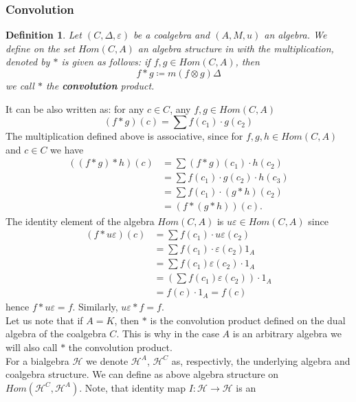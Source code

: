 \documentclass[a4paper, 12pt]{report}
\newtheorem{definition}{Definition}
\begin{document}
\subsubsection{Convolution}
\begin{definition}
Let $(C, \Delta, \varepsilon)$ be a coalgebra and $(A, M, u)$ an algebra. We define on the set $Hom(C, A)$
an algebra structure in with the multiplication, denoted by $*$ is given as follows: if
$f, g \in Hom(C, A)$, then
\begin{equation*}
f*g \coloneqq m(f \otimes g)\Delta
\end{equation*}
we call $*$ the \textbf{convolution} product.
\end{definition}
It can be also written as: for any $c \in C$, any $f, g \in Hom(C, A)$
\begin{equation*}
(f*g)(c) = \sum f(c_1) \cdot g(c_2)
\end{equation*}
The multiplication defined above is associative, since for $f, g, h \in Hom(C, A)$ and
$c \in C$ we have
\begin{align*}
((f*g)*h)(c) &= \sum(f*g)(c_1)\cdot h(c_2) \\
&= \sum f(c_1) \cdot g(c_2) \cdot h(c_3) \\
&= \sum f(c_1) \cdot (g*h)(c_2) \\
&= (f*(g*h))(c).
\end{align*}
The identity element of the algebra $Hom(C, A)$ is $u\varepsilon \in Hom(C, A)$ since
\begin{align*}
(f * u\varepsilon)(c) &= \sum f(c_1) \cdot u\varepsilon(c_2) \\
&= \sum f(c_1) \cdot \varepsilon(c_2)1_A \\
&= \sum f(c_1)\varepsilon(c_2) \cdot 1_A \\
&= \left(\sum f(c_1)\varepsilon(c_2)\right)\cdot 1_A \\
&= f(c) \cdot 1_A = f(c)
\end{align*}
hence $f * u\varepsilon = f$. Similarly, $u\varepsilon * f = f$. \\
Let us note that if $A = K$, then $*$ is the convolution product defined on the dual algebra of the
coalgebra $C$. This is why in the case $A$ is an arbitrary algebra we will also call $*$ the convolution
product. \\[8pt]
\indent For a bialgebra $\mathcal{H}$ we denote $\mathcal{H}^A$, $\mathcal{H}^C$ as, respectivly,
the underlying algebra and coalgebra structure. We can define as above algebra structure on
$Hom(\mathcal{H}^C, \mathcal{H}^A)$. Note, that identity map $I : \mathcal{H} \to \mathcal{H}$ is an
\end{document}
